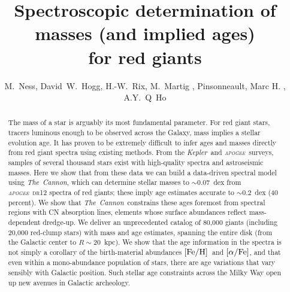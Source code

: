 \documentclass[12pt, preprint]{aastex}
\newcommand{\project}[1]{\textsl{#1}}
\newcommand{\tc}{\project{The~Cannon}}
\newcommand{\apogee}{\project{\textsc{apogee}}}
\newcommand{\kepler}{\project{Kepler}}
\newcommand{\feh}{\mbox{$\rm [Fe/H]$}}
\newcommand{\alphafe}{\mbox{$\rm [\alpha/Fe]$}}
\begin{document}
\title{Spectroscopic determination of masses (and implied ages) \\for red giants}
\author{M.~Ness,
        David~W.~Hogg,
        H.-W.~Rix,
        M.~Martig , 
       Pinsonneault, Marc H. ,
        A.Y.~Q~Ho }

\begin{abstract}%
The mass of a star is arguably its most fundamental parameter.
For red giant stars, tracers luminous enough to be observed
across the Galaxy, mass implies a stellar evolution age.
It has proven to be extremely difficult to infer ages and masses directly from red giant spectra using existing methods.
From the \kepler\ and \apogee\ surveys, samples of several thousand
stars exist with high-quality spectra and astroseismic masses.
Here we show that from these data we can build a data-driven spectral
model using \tc, which can determine stellar masses to $\sim 0.07$~dex
from \apogee\ \textsc{dr12} spectra of red giants; these imply age
estimates accurate to $\sim 0.2$~dex (40 percent).
We show that \tc\ constrains these ages foremost from spectral regions
with CN absorption lines, elements whose surface abundances reflect
mass-dependent dredge-up.
We deliver an unprecedented catalog of 80,000 giants (including 20,000
red-clump stars) with mass and age estimates, spanning the entire disk
(from the Galactic center to $R\sim 20$~kpc).
We show that the age information in the spectra is not simply a
corollary of the birth-material abundances \feh\ and \alphafe, and
that even within a mono-abundance population of stars, there are age
variations that vary sensibly with Galactic position.
Such stellar age constraints across the Milky Way open up new avenues
in Galactic archeology.
\end{abstract}
\end{document}
